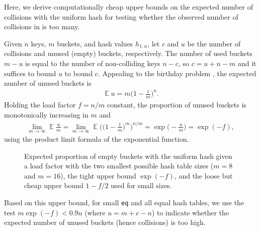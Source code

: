\documentclass[sigconf]{acmart}
\newcommand*\lisp[1]{\texttt{#1}}
\newcommand{\E}{\mathop{{}\mathbb{E}}}
\begin{document}
Here, we derive computationally cheap upper bounds on the expected number of collisions with the uniform hash for testing whether the observed number of collisions in  is too many.

Given $n$ keys, $m$ buckets, and hash values $h_{1:n}$, let $c$ and $u$ be the number of collisions and unused (empty) buckets, respectively.
The number of used buckets $m-u$ is equal to the number of non-colliding keys $n-c$, so $c=u+n-m$ and it suffices to bound $u$ to bound $c$.
Appealing to the birthday problem \citep{siegrist1197random}, the expected number of unused buckets is
\begin{align*}
\E u = m \biggl(1-\frac{1}{m}\biggr)^n.
\end{align*}
Holding the load factor $f=n/m$ constant, the  proportion of unused buckets is monotonically increasing in $m$ and
\begin{align*}
\lim_{m \to \infty} \E \frac{u}{m} = \lim_{m \to \infty} \E \Biggl(\biggl(1-\frac{1}{m}\biggr)^m\Biggr)^{n/m} = \exp\biggl(-\frac{n}{m}\biggr) = \exp(-f),
\end{align*}
using the product limit formula of the exponential function.

\begin{figure}[H]
\caption{Expected proportion of empty buckets with the uniform hash given a load factor with the two smallest possible hash table sizes ($m=8$ and $m=16$), the tight upper bound $\exp(-f)$, and the loose but cheap upper bound $1-f/2$ used for small sizes.}
\Description{}
\end{figure}

Based on this upper bound, for small \lisp{eq} and all {equal} hash tables, we use the test $m\exp(-f) < 0.9u$ (where $u=m+c-n$) to indicate whether the expected number of unused buckets (hence collisions) is too high.
\end{document}
